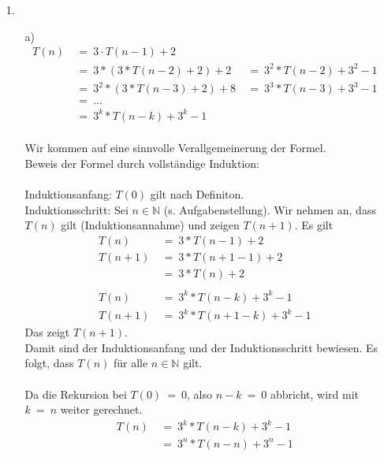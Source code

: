 \documentclass{article}
\begin{document}
\begin{enumerate}
    \item[1.]
    \begin{enumerate}
        \item [a)]
        \[
            \begin{array}{lll}
                T(n)~&=~3 \cdot T(n-1)+2 &\\
                &=~3*(3*T(n-2)+2)+2~&=~3^2*T(n-2)+3^2-1\\
                &=~3^2*(3*T(n-3)+2)+8~&=~3^3*T(n-3)+3^3-1\\
                &=~...&\\
                &=~3^k*T(n-k)+3^k-1
            \end{array}
        \]
        \\
        Wir kommen auf eine sinnvolle Verallgemeinerung der Formel.\\
        Beweis der Formel durch vollständige Induktion:\\\\
        Induktionsanfang: $T(0)$ gilt nach Definiton.\\
        Induktionsschritt: Sei $n \in \mathbb{N}$ (s. Aufgabenstellung). Wir nehmen an, dass $T(n)$ gilt (Induktionsannahme) und zeigen $T(n+1)$. Es gilt\\
        \[
            \begin{array}{ll}
                T(n)~&=~3*T(n-1)+2\\
                T(n+1)~&=~3*T(n+1-1)+2\\
                &=~3*T(n)+2
                \\\\
                T(n)~&=~3^k*T(n-k)+3^k-1\\
                T(n+1)~&=~3^k*T(n+1-k)+3^k-1
            \end{array}
        \]
        Das zeigt $T(n+1)$.\\
        Damit sind der Induktionsanfang und der Induktionsschritt bewiesen. Es folgt, dass $T(n)$ für alle $n \in \mathbb{N}$ gilt.\\
        \\
        Da die Rekursion bei $T(0)~=~0$, also $n-k~=~0$ abbricht, wird mit $k~=~n$ weiter gerechnet.\\
        \[
            \begin{array}{ll}
                T(n)~&=~3^k*T(n-k)+3^k-1\\
                &=~3^n*T(n-n)+3^n-1\\

\end{array}\]
\end{enumerate}
\end{enumerate}
\end{document}
